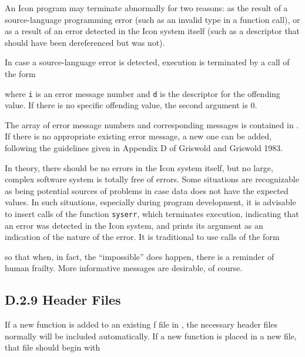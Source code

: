 An Icon program may terminate abnormally for two reasons: as the
result of a source-language programming error (such as an invalid type
in a function call), or as a result of an error detected in the Icon
system itself (such as a descriptor that should have been dereferenced
but was not).

In case a source-language error is detected, execution is terminated
by a call of the form


\noindent where \texttt{i} is an error message number and \texttt{d} is the
descriptor for the offending value. If there is no specific offending
value, the second argument is 0.

The array of error message numbers and corresponding messages is
contained in . If there is no appropriate existing error
message, a new one can be added, following the guidelines given in
Appendix D of Griswold and Griswold 1983.

In theory, there should be no errors in the Icon system itself, but no
large, complex software system is totally free of errors. Some situations
are recognizable as being potential sources of problems in case data does
not have the expected values. In such situations, especially during program
development, it is advisable to insert calls of the function
\texttt{syserr}, which terminates execution, indicating that an error was
detected in the Icon system, and prints its argument as an indication of
the nature of the error. It is traditional to use calls of the form


\noindent so that when, in fact, the ``impossible'' does happen, there is a
reminder of human frailty.  More informative messages are desirable, of
course.

\subsection[D.2.9 Header Files]{D.2.9 Header Files}

If a new function is added to an existing f file in , the
necessary header files normally will be included automatically. If a
new function is placed in a new file, that file should begin with


